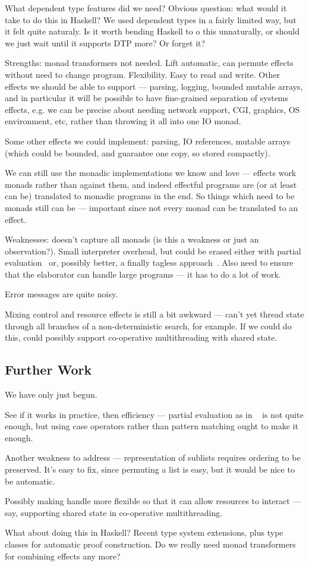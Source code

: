 What dependent type features did we need? Obvious question: what would
it take to do this in Haskell? We used dependent types in a fairly limited
way, but it felt quite naturaly. Is it worth bending Haskell to o this
unnaturally, or should we just wait until it supports DTP more? Or forget it?


Strengths: monad transformers not needed. Lift automatic, can permute effects
without need to change program. Flexibility. Easy to read and write.
Other effects we should be able to support --- parsing, logging, bounded
mutable arrays, and in particular
it will be possible to have fine-grained separation of systems effects, e.g.
we can be precise about needing network support, CGI, graphics, OS
environment, etc, rather than throwing it all into one IO monad.

Some other effects we could implement: parsing, IO references, mutable
arrays (which could be bounded, and guarantee one copy, so stored compactly).

We can still use the monadic implementations we know and love --- effects work
 monads rather than against them, and indeed effectful programs
are (or at least can be) translated to monadic programs in the end. So things
which need to be monads still can be --- important since not every monad
can be translated to an effect.

Weaknesses: doesn't capture all monads (is this a weakness or just an
observation?). Small interpreter overhead, but could be erased either with
partial evaluation~\cite{Brady2010} or, possibly better, a finally
tagless approach~\cite{Carette2009}. Also need to ensure that the elaborator
can handle large programs --- it has to do a lot of work.

Error messages are quite noisy.

Mixing control and resource effects is still a bit awkward --- can't yet
thread state through all branches of a non-deterministic search, for example.
If we could do this, could possibly support co-operative multithreading with
shared state.

\subsection{Further Work}

We have only just begun.

See if it works in practice, then efficiency --- partial evaluation as in
~\cite{Brady2010} is not quite enough, but using case operators rather
than pattern matching ought to make it enough.

Another weakness to address --- representation of sublists requires ordering
to be preserved. It's easy to fix, since permuting a list is easy, but it
would be nice to be automatic.

Possibly making handle more flexible so that it can allow resources to interact
--- say, supporting shared state in co-operative multithreading.

What about doing this in Haskell? Recent type system extensions, plus type
classes for automatic proof construction. Do we really need monad transformers
for combining effects any more?


